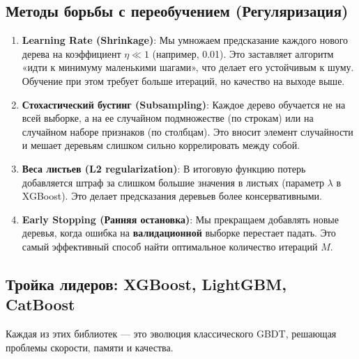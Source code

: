 \documentclass[12pt]{article}
\begin{document}
\subsection{Методы борьбы с переобучением (Регуляризация)}
\begin{enumerate}
    \item \textbf{Learning Rate (Shrinkage)}: Мы умножаем предсказание каждого нового дерева на коэффициент $\eta \ll 1$ (например, 0.01). Это заставляет алгоритм «идти к минимуму маленькими шагами», что делает его устойчивым к шуму. Обучение при этом требует больше итераций, но качество на выходе выше.
    
    \item \textbf{Стохастический бустинг (Subsampling)}: Каждое дерево обучается не на всей выборке, а на ее случайном подмножестве (по строкам) или на случайном наборе признаков (по столбцам). Это вносит элемент случайности и мешает деревьям слишком сильно коррелировать между собой.
    
    \item \textbf{Веса листьев (L2 regularization)}: В итоговую функцию потерь добавляется штраф за слишком большие значения в листьях (параметр $\lambda$ в XGBoost). Это делает предсказания деревьев более консервативными.
    
    \item \textbf{Early Stopping (Ранняя остановка)}: Мы прекращаем добавлять новые деревья, когда ошибка на \textbf{валидационной} выборке перестает падать. Это самый эффективный способ найти оптимальное количество итераций $M$.
\end{enumerate}

\subsection{Тройка лидеров: XGBoost, LightGBM, CatBoost}

Каждая из этих библиотек — это эволюция классического GBDT, решающая проблемы скорости, памяти и качества.
\end{document}
